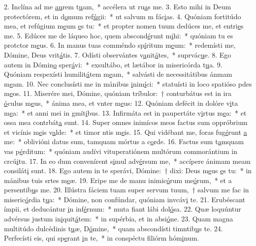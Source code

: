2. Inclína ad me \uline{au}rem t\uline{u}am,~* accélera ut ru\uline{a}s me.
3. Esto mihi in Deum protectórem, et in d\uline{o}mum ref\uline{ú}gii:~* ut salvum m fác\uline{i}as.
4. Quóniam fortitúdo mea, et refúgium m\uline{e}um \uline{e}s tu:~* et propter nomen tuum dedúces me, et entri\uline{e}s me.
5. Edúces me de láqueo hoc, quem abscond\uline{é}runt m\uline{i}hi:~* quóniam tu es protctor m\uline{e}us.
6. In manus tuas comméndo sp\uline{í}ritum m\uline{e}um:~* redemísti me, Dómine, Deus vrit\uline{á}tis.
7. Odísti observántes v\uline{a}nit\uline{á}tes,~* suprvác\uline{u}e.
8. Ego autem in Dómin\uline{o} sper\uline{á}vi:~* exsultábo, et lætábor in misericórda t\uline{u}a.
9. Quóniam respexísti humilit\uline{á}tem m\uline{e}am,~* salvásti de necessitátibus ánmam m\uline{e}am.
10. Nec conclusísti me in mánibus \uline{i}nim\uline{í}ci:~* statuísti in loco spatióso pdes m\uline{e}os.
11. Miserére mei, Dómine, quóniam tríbulor:~† conturbátus est in ira \uline{ó}culus m\uline{e}us,~* ánima mea, et vnter m\uline{e}us:
12. Quóniam defécit in dolóre v\uline{i}ta m\uline{e}a:~* et anni mei in gmít\uline{i}bus.
13. Infirmáta est in paupertáte v\uline{i}rtus m\uline{e}a:~* et ossa mea contrbát\uline{a} sunt.
14. Super omnes inimícos meos factus sum oppróbrium et vicínis m\uline{e}is v\uline{a}lde:~* et timor ntis m\uline{e}is.
15. Qui vidébant me, foras fug\uline{é}runt \uline{a} me:~* oblivióni datus sum, tamquam mórtus a c\uline{o}rde.
16. Factus sum t\uline{a}mquam vas p\uline{é}rditum:~* quóniam audívi vituperatiónem multórum commorántium in crcú\uline{i}tu.
17. In eo dum convenírent s\uline{i}mul adv\uline{é}rsum me,~* accípere ánimam meam consilát\uline{i} sunt.
18. Ego autem in te sperávi, Dómine:~† dixi: Deus m\uline{e}us \uline{e}s tu:~* in mánibus tuis srtes m\uline{e}æ.
19. Eripe me de manu inimic\uline{ó}rum me\uline{ó}rum,~* et a persentib\uline{u}s me.
20. Illústra fáciem tuam super servum tuum,~† salvum me fac in miseric\uline{ó}rdia t\uline{u}a:~* Dómine, non confúndar, quóniam invcáv\uline{i} te.
21. Erubéscant ímpii, et deducántur \uline{i}n inf\uline{é}rnum:~* muta fiant lábi dol\uline{ó}sa.
22. Quæ loquúntur advérsus justum in\uline{i}quit\uline{á}tem:~* in supérbia, et in absi\uline{ó}ne.
23. Quam magna multitúdo dulcédinis t\uline{u}æ, D\uline{ó}mine,~* quam abscondísti timntib\uline{u}s te.
24. Perfecísti eis, qui sp\uline{e}rant \uline{i}n te,~* in conspéctu filiórm hóm\uline{i}num.

